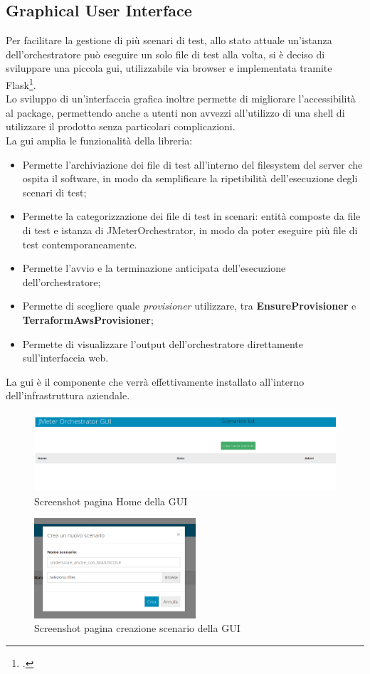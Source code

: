 \subsection{Graphical User Interface}
Per facilitare la gestione di più scenari di test, allo stato attuale un'istanza dell'orchestratore può eseguire un solo file di test alla volta, si è deciso di sviluppare una piccola \gls{gui}, utilizzabile via browser e implementata tramite Flask\footcite{site:flask}. \\
Lo sviluppo di un'interfaccia grafica inoltre permette di migliorare l'accessibilità al package, permettendo anche a utenti non avvezzi all'utilizzo di una \gls{shell} di utilizzare il prodotto senza particolari complicazioni.\\
La \gls{gui} amplia le funzionalità della libreria:
\begin{itemize}
	\item Permette l'archiviazione dei file di test all'interno del \gls{filesystem} del server che ospita il software, in modo da semplificare la ripetibilità dell'esecuzione degli scenari di test;
	\item Permette la categorizzazione dei file di test in scenari: entità composte da file di test e istanza di JMeterOrchestrator, in modo da poter eseguire più file di test contemporaneamente.
	\item Permette l'avvio e la terminazione anticipata dell'esecuzione dell'orchestratore;
	\item Permette di scegliere quale \textit{provisioner} utilizzare, tra \textbf{EnsureProvisioner} e \textbf{TerraformAwsProvisioner};
	\item Permette di visualizzare l'output dell'orchestratore direttamente sull'interfaccia web.
\end{itemize}
La \gls{gui} è il componente che verrà effettivamente installato all'interno dell'infrastruttura aziendale.
\begin{figure}[H]
	\centering
	\includegraphics[width=\textwidth]{immagini/guihome}
	\caption{Screenshot pagina Home della GUI}
	\label{img-guihome}
\end{figure}
\begin{figure}[H]
	\centering
	\includegraphics[width=6cm]{immagini/guicreate}
	\caption{Screenshot pagina creazione scenario della GUI}
	\label{img-guicreate}
\end{figure}
